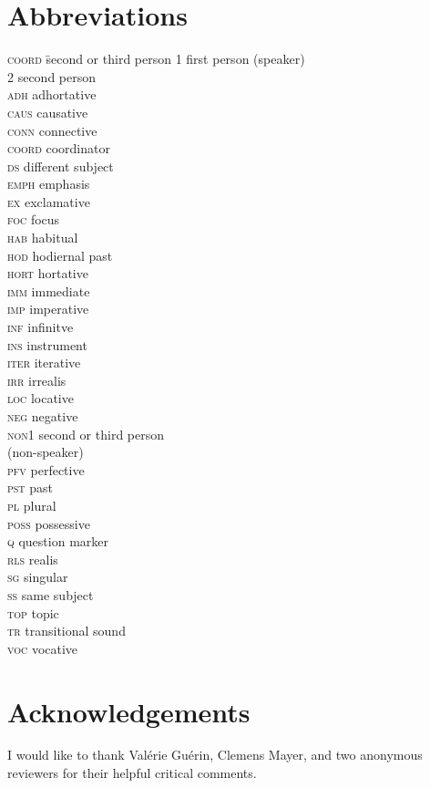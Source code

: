 \documentclass[output=paper]{LSP/langsci}
\begin{document}
			
			
\section*{Abbreviations}
\begin{multicols}{2}
\begin{tabbing}
\textsc{coord} \hspace{.5cm} \= second or third person\kill
\textsc{1}     \> first person (speaker)\\
\textsc{2}     \> second person\\
\textsc{adh}   \> adhortative\\
\textsc{caus}  \>  causative\\
\textsc{conn}  \>      connective\\
\textsc{coord} \>     coordinator\\
\textsc{ds}    \>    different subject\\
\textsc{emph}  \>      emphasis\\
\textsc{ex}    \>    exclamative\\
\textsc{foc}   \>     focus\\
\textsc{hab}   \>     habitual\\
\textsc{hod}   \>     hodiernal past\\
\textsc{hort}  \>      hortative\\
\textsc{imm}   \>     immediate\\
\textsc{imp}   \>     imperative\\
\textsc{inf}   \>     infinitve\\
\textsc{ins}   \>     instrument\\
\textsc{iter}  \>      iterative\\
\textsc{irr}   \>     irrealis\\
\textsc{loc}   \>     locative\\
\textsc{neg}   \>     negative\\
\textsc{non1}  \>      second or third person \\ \> (non-speaker)\\
\textsc{pfv}   \>     perfective\\
\textsc{pst}   \>     past\\
\textsc{pl}    \>    plural\\
\textsc{poss}  \>      possessive\\
\textsc{q}     \>     question marker\\
\textsc{rls}   \>     realis\\
\textsc{sg}    \>    singular\\
\textsc{ss}    \>    same subject\\
\textsc{top}   \>     topic\\
\textsc{tr}    \>    transitional sound\\
\textsc{voc}   \>     vocative
\end{tabbing}
\end{multicols}

\section*{Acknowledgements}
I would like to thank Valérie Guérin, Clemens Mayer, and two anonymous reviewers for their helpful critical comments.


\sloppy

\printbibliography[heading=subbibliography,notkeyword=this]
\end{document}
